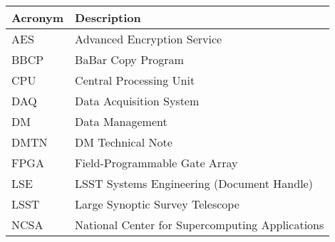 \addtocounter{table}{-1}
\begin{longtable}{|l|p{}|}\hline
\textbf{Acronym} & \textbf{Description}  \\\hline

AES & Advanced Encryption Service \\\hline
BBCP & BaBar Copy Program \\\hline
CPU & Central Processing Unit \\\hline
DAQ & Data Acquisition System \\\hline
DM & Data Management \\\hline
DMTN & DM Technical Note \\\hline
FPGA & Field-Programmable Gate Array \\\hline
LSE & LSST Systems Engineering (Document Handle) \\\hline
LSST & Large Synoptic Survey Telescope \\\hline
NCSA & National Center for Supercomputing Applications \\\hline
\end{longtable}
